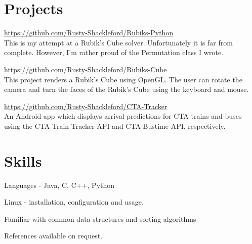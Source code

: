 \documentclass[letterpaper, 11pt, oneside]{memoir}
\begin{document}
\section*{Projects}
\begin{compactitem}
    \item \url{https://github.com/Rusty-Shackleford/Rubiks-Python} \\
    This is my attempt at a Rubik's Cube solver. Unfortunately it is far from
    complete. However, I'm rather proud of the Permutation class I wrote.
    
    \item \url{https://github.com/Rusty-Shackleford/Rubiks-Cube} \\
    This project renders a Rubik's Cube using OpenGL. The user can rotate the 
    camera and turn the faces of the Rubik's Cube using the keyboard and mouse. 

    \item \url{https://github.com/Rusty-Shackleford/CTA-Tracker} \\
    An Android app which displays arrival predictions for CTA trains and buses 
    using the CTA Train Tracker API and CTA Bustime API, respectively. 
\end{compactitem}


\section*{Skills}
\begin{compactitem}
    \item Languages - Java, C, C++, Python
    \item Linux - installation, configuration and usage.
    \item Familiar with common data structures and sorting algorithms
\end{compactitem}

References available on request. 
\end{document}
